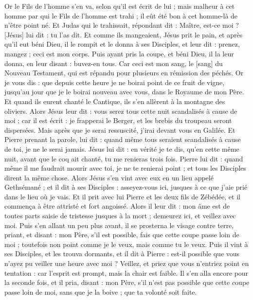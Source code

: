 \begin{multicols}{2}
Or le Fils de l'homme s'en va, selon qu'il est écrit de lui ; mais malheur à cet homme par qui le Fils de l'homme est trahi ; il eût été bon à cet homme-là de n'être point né.
Et Judas qui le trahissait, répondant dit : Maître, est-ce moi ? [Jésus] lui dit : tu l'as dit.
Et comme ils mangeaient, Jésus prit le pain, et après qu'il eut béni Dieu, il le rompit et le donna à ses Disciples, et leur dit : prenez, mangez ; ceci est mon corps.
Puis ayant pris la coupe, et béni Dieu, il la leur donna, en leur disant : buvez-en tous.
Car ceci est mon sang, le [sang] du Nouveau Testament, qui est répandu pour plusieurs en rémission des péchés.
Or je vous dis : que depuis cette heure je ne boirai point de ce fruit de vigne, jusqu'au jour que je le boirai nouveau avec vous, dans le Royaume de mon Père.
Et quand ils eurent chanté le Cantique, ils s'en allèrent à la montagne des oliviers.
Alors Jésus leur dit : vous serez tous cette nuit scandalisés à cause de moi ; car il est écrit : je frapperai le Berger, et les brebis du troupeau seront dispersées.
Mais après que je serai ressuscité, j'irai devant vous en Galilée.
Et Pierre prenant la parole, lui dit : quand même tous seraient scandalisés à cause de toi, je ne le serai jamais.
Jésus lui dit : en vérité je te dis, qu'en cette même nuit, avant que le coq ait chanté, tu me renieras trois fois.
Pierre lui dit : quand même il me faudrait mourir avec toi, je ne te renierai point ; et tous les Disciples dirent la même chose.
Alors Jésus s'en vint avec eux en un lieu appelé Gethsémané ; et il dit à ses Disciples : asseyez-vous ici, jusques à ce que j'aie prié dans le lieu où je vais.
Et il prit avec lui Pierre et les deux fils de Zébédée, et il commença à être attristé et fort angoissé.
Alors il leur dit : mon âme est de toutes parts saisie de tristesse jusques à la mort ; demeurez ici, et veillez avec moi.
Puis s'en allant un peu plus avant, il se prosterna le visage contre terre, priant, et disant : mon Père, s'il est possible, fais que cette coupe passe loin de moi ; toutefois non point comme je le veux, mais comme tu le veux.
Puis il vint à ses Disciples, et les trouva dormants, et il dit à Pierre : est-il possible que vous n'ayez pu veiller une heure avec moi ?
Veillez, et priez que vous n'entriez point en tentation : car l'esprit est prompt, mais la chair est faible.
Il s'en alla encore pour la seconde fois, et il pria, disant : mon Père, s'il n'est pas possible que cette coupe passe loin de moi, sans que je la boive ; que ta volonté soit faite.

\end{multicols}
